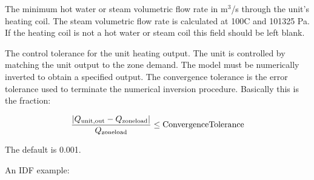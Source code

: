 The minimum hot water or steam volumetric flow rate in m\(^{3}\)/s through the unit's heating coil. The steam volumetric flow rate is calculated at 100C and 101325 Pa. If the heating coil is not a hot water or steam coil this field should be left blank.

The control tolerance for the unit heating output. The unit is controlled by matching the unit output to the zone demand. The model must be numerically inverted to obtain a specified output. The convergence tolerance is the error tolerance used to terminate the numerical inversion procedure. Basically this is the fraction:

\begin{equation}
  \frac{\left| Q_{\rm{unit, out}} - Q_{\rm{zone load}} \right|}{Q_{\rm{zone load}}} \le \rm{ConvergenceTolerance}
\end{equation}


The default is 0.001.

An IDF example:

